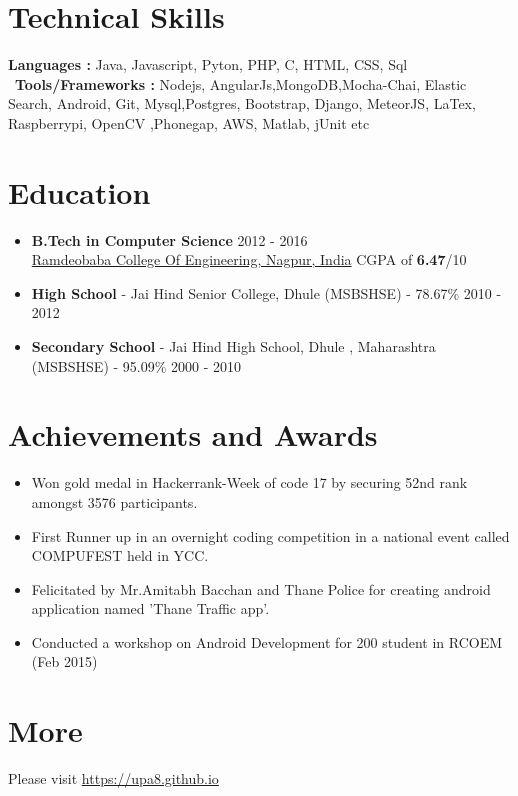 \documentclass[margin, centered]{res}
\begin{document}
\begin{resume}
\section{Technical Skills}
\textbf{Languages : }
	Java, Javascript, Pyton, PHP, C, HTML, CSS, Sql \\
\
\textbf{Tools/Frameworks : }
Nodejs, AngularJs,MongoDB,Mocha-Chai, Elastic Search, Android, Git, Mysql,Postgres, Bootstrap, Django, MeteorJS, LaTex, Raspberrypi, OpenCV ,Phonegap, AWS, Matlab, jUnit etc
\	
	
\section{Education}
\begin{itemize}[leftmargin=*]\item
\textbf{B.Tech in Computer Science} \hfill 2012 - 2016 \\
\href{http://rknec.edu}{Ramdeobaba College Of Engineering, Nagpur, India}
  CGPA of \textbf{6.47}/10
\item\textbf{High School} - {Jai Hind Senior College, Dhule} (MSBSHSE) - 78.67\% \hfill 2010 - 2012 \
\item\textbf{Secondary School} - Jai Hind High School, Dhule , Maharashtra (MSBSHSE) - 95.09\% \hfill 2000 - 2010
\end{itemize}

\section{Achievements and Awards}
\begin{itemize}[leftmargin=*]
 \item Won gold medal in Hackerrank-Week of code 17 by securing 52nd rank amongst 3576 participants. 
 \item First Runner up in an overnight coding competition in a national event called COMPUFEST held in YCC.
 \item Felicitated by Mr.Amitabh Bacchan and Thane Police for creating android application named 'Thane Traffic 
app'.
\item 
 Conducted a workshop on Android Development for 200 student in RCOEM (Feb 2015)
\end{itemize}

\section{More}
Please visit \href{https://upa8.github.io}{https://upa8.github.io}
\end{resume}
\end{document}
